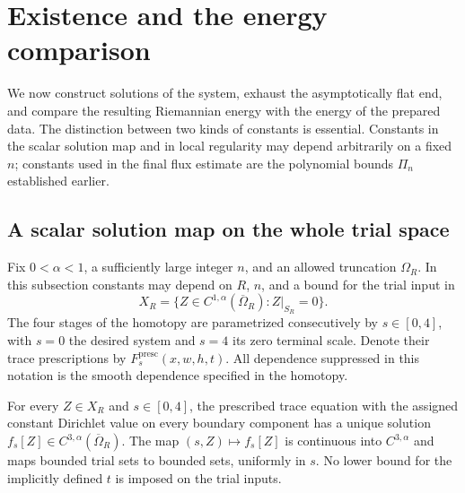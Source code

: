 \section{Existence and the energy comparison}\label{four:sec:existence}

We now construct solutions of the system, exhaust the asymptotically flat
end, and compare the resulting Riemannian energy with the energy of the
prepared data.  The distinction between two kinds of constants is essential.
Constants in the scalar solution map and in local regularity may depend
arbitrarily on a fixed $n$; constants used in the final flux estimate are
the polynomial bounds $\Pi_n$ established earlier.

\subsection{A scalar solution map on the whole trial space}

Fix $0<\alpha<1$, a sufficiently large integer $n$, and an allowed
truncation $\Omega_R$.  In this subsection constants may depend on $R$,
$n$, and a bound for the trial input in
\[
 X_R=\{Z\in C^{1,\alpha}(\overline\Omega_R):Z|_{S_R}=0\}.
\]
The four stages of the homotopy are parametrized consecutively by
$s\in[0,4]$, with $s=0$ the desired system and $s=4$ its zero terminal
scale.  Denote their trace prescriptions by
$F_s^{\mathrm{presc}}(x,w,h,t)$.  All dependence suppressed in this
notation is the smooth dependence specified in the homotopy.

\begin{lemma}\label{four:ex:scalar-trial}
For every $Z\in X_R$ and $s\in[0,4]$, the prescribed trace equation with
the assigned constant Dirichlet value on every boundary component has a
unique solution $f_s[Z]\in C^{3,\alpha}(\overline\Omega_R)$.  The map
$(s,Z)\mapsto f_s[Z]$ is continuous into $C^{3,\alpha}$ and maps bounded
trial sets to bounded sets, uniformly in $s$.  No lower bound for the
implicitly defined $t$ is imposed on the trial inputs.
\end{lemma}

